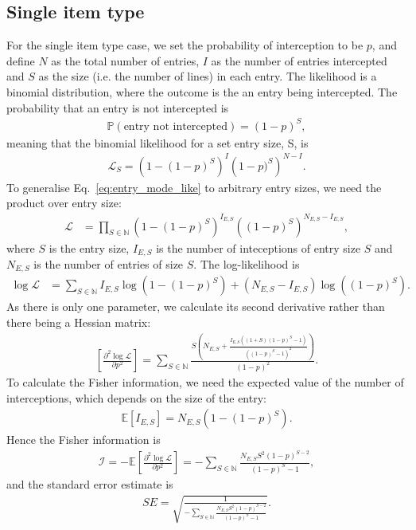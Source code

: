 \documentclass{article}
\begin{document}
\subsection{Single item type}
For the single item type case, we set the probability of interception to be \(p\), and define \(N\) as the total number of entries, \(I\) as the number of entries intercepted and \(S\) as the size (i.e. the number of lines) in each entry. The likelihood is a binomial distribution, where the outcome is the an entry being intercepted. The probability that an entry is not intercepted is
\begin{align}
\mathbb{P}(\text{entry not intercepted}) = (1-p)^S,
\end{align}
meaning that the binomial likelihood for a set entry size, S, is
\begin{align}
\mathcal{L}_S = \left(1-(1-p)^S\right)^I\left(1-p)^S\right)^{N-I}. \label{eq:entry_mode_like}
\end{align}
To generalise Eq.~\eqref{eq:entry_mode_like} to arbitrary entry sizes, we need the product over entry size:
\begin{align}
\mathcal{L}& = \prod_{S\in\mathbb{N}} \left(1-(1-p)^S\right)^{I_{E,S}}\left((1-p)^S\right)^{N_{E,S}-I_{E,S}},
\label{eq:aymptotic_full_likelihood}
\end{align}
where \(S\) is the entry size, \(I_{E,S}\) is the number of inteceptions of entry size \(S\) and \(N_{E,S}\) is the number of entries of size \(S\).  The log-likelihood is
\begin{align}
\log\mathcal{L}& = \sum_{S\in\mathbb{N}}{I_{E,S}} \log\left(1-(1-p)^S\right)+(N_{E,S}-I_{E,S})\log\left((1-p)^S\right).
\label{eq:loglikelihood_arbitrary_entry_size}
\end{align}
As there is only one parameter, we calculate its second derivative rather than there being a Hessian matrix:
\begin{align}
\left[\frac{\partial^2 \log\mathcal{L}}{\partial p^2}\right]= \sum_{S\in\mathbb{N}}
\frac{S\left(N_{E,S} + \frac{I_{E,S}((1+S)(1-p)^S-1)}
{\left((1-p)^S-1 \right)^2} \right)}
{(1-p)^2}.\label{eq:loglike_2nd_deriv}
\end{align}
To calculate the Fisher information, we need the expected value of the number of interceptions, which depends on the size of the entry:
\begin{align}
\mathbb{E}\left[I_{E,S}\right] = N_{E,S}(1-(1-p)^S). \label{eq:exp_intercept}
\end{align} 
Hence the Fisher information is
\begin{align}
\mathcal{I} = -\mathbb{E}\left[\frac{\partial^2 \log\mathcal{L}}{\partial p^2}\right]=
 -\sum_{S\in\mathbb{N}}\frac{N_{E,S}S^2(1-p)^{S-2}}{(1-p)^S-1}, \label{eq:fisher_information}
\end{align}
and the standard error estimate is
\begin{align}
SE = \sqrt{\frac{1}{-\sum_{S\in\mathbb{N}}\frac{N_{E,S}S^2(1-p)^{S-2}}{(1-p)^S-1}}}.\label{eq:general_SE_calc}
\end{align}
\end{document}

